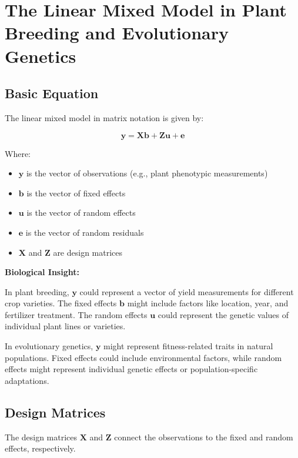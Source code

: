 \documentclass[12pt,a4paper]{article}
\newenvironment{biologicalinsightbox}[1][]
{\begin{basebox}[linecolor=uqpurple]
\textbf{\color{uqpurple}Biological Insight:} \textit{#1}\par\noindent\ignorespaces}
{\end{basebox}}
\begin{document}
\section{The Linear Mixed Model in Plant Breeding and Evolutionary Genetics}

\subsection{Basic Equation}

The linear mixed model in matrix notation is given by:

\begin{equation}
    \mathbf{y} = \mathbf{Xb} + \mathbf{Zu} + \mathbf{e}
\end{equation}

Where:
\begin{itemize}
    \item $\mathbf{y}$ is the vector of observations (e.g., plant phenotypic measurements)
    \item $\mathbf{b}$ is the vector of fixed effects
    \item $\mathbf{u}$ is the vector of random effects
    \item $\mathbf{e}$ is the vector of random residuals
    \item $\mathbf{X}$ and $\mathbf{Z}$ are design matrices
\end{itemize}

\begin{biologicalinsightbox}
    
In plant breeding, $\mathbf{y}$ could represent a vector of yield measurements for different crop varieties. The fixed effects $\mathbf{b}$ might include factors like location, year, and fertilizer treatment. The random effects $\mathbf{u}$ could represent the genetic values of individual plant lines or varieties.

In evolutionary genetics, $\mathbf{y}$ might represent fitness-related traits in natural populations. Fixed effects could include environmental factors, while random effects might represent individual genetic effects or population-specific adaptations.
\end{biologicalinsightbox}

\subsection{Design Matrices}

The design matrices $\mathbf{X}$ and $\mathbf{Z}$ connect the observations to the fixed and random effects, respectively.
\end{document}
